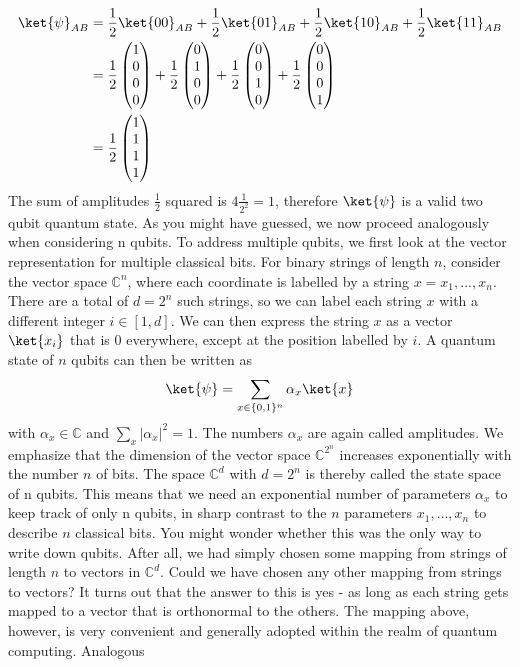 \documentclass[12pt, oneside]{book}
\theoremstyle{definition}
\theoremstyle{definition}
\theoremstyle{remark}
\begin{document}
\begin{align*}
\ket{\psi}_{AB}&=\frac{1}{2}\ket{00}_{AB}+\frac{1}{2}\ket{01}_{AB}+\frac{1}{2}\ket{10}_{AB}+\frac{1}{2}\ket{11}_{AB}\\
&=\frac{1}{2}\begin{pmatrix} 1 \\ 0 \\ 0 \\ 0 \end{pmatrix}+\frac{1}{2}\begin{pmatrix} 0 \\ 1 \\ 0 \\ 0 \end{pmatrix} + \frac{1}{2}\begin{pmatrix} 0 \\ 0 \\ 1 \\ 0 \end{pmatrix} + \frac{1}{2}\begin{pmatrix} 0 \\ 0 \\ 0 \\ 1 \end{pmatrix}\\
&=\frac{1}{2}\begin{pmatrix} 1 \\ 1 \\ 1 \\ 1 \end{pmatrix}
\end{align*}
The sum of amplitudes $\frac{1}{2}$ squared is $4\frac{1}{2^2}=1$, therefore $\ket{\psi}$ is a valid two qubit quantum state. As you might have guessed, we now proceed analogously when considering n qubits. To address
multiple qubits, we first look at the vector representation for multiple classical bits. For binary
strings of length $n$, consider the vector space $\mathbb{C}^n$, where each coordinate is labelled by a string
$x = x_1,..., x_n$. There are a total of $d = 2^n$ such strings, so we can label each string $x$ with a different
integer $i \in [1,d]$. We can then express the string $x$ as a vector $\ket{x_i}$ that is $0$ everywhere, except at the position labelled by $i$. A quantum state of $n$ qubits can then be written as
\[
\ket{\psi}=\sum_{x\in\{0,1\}^n} \alpha_x\ket{x}
\]
with $\alpha_x\in\mathbb{C}$ and $\sum_x |\alpha_x|^2=1$. The numbers $\alpha_x$ are again called amplitudes. We emphasize that the dimension of the vector space $\mathbb{C}^{2^n}$ increases exponentially with the number $n$ of bits. The space $\mathbb{C}^d$ with $d=2^n$ is thereby called the state space of n qubits. This means that we need an exponential number of parameters $\alpha_x$ to keep track of only n qubits, in sharp contrast to the $n$ parameters $x_1,\ldots , x_n$ to describe $n$ classical bits. You might wonder whether this was the only way to write down qubits. After all, we had simply chosen some mapping from strings of length $n$ to vectors in $\mathbb{C}^d$. Could we have chosen any other mapping from strings to vectors? It turns out that the answer to this is yes - as long as each string gets mapped to a vector that is orthonormal to the others. The mapping above, however, is very convenient and generally adopted within the realm of quantum computing. Analogous
\end{document}
